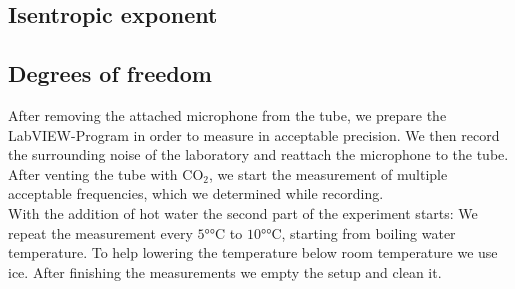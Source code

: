\documentclass[../main.tex]{subfiles}
\begin{document}
\subsection{Isentropic exponent}

\subsection{Degrees of freedom}
    After removing the attached microphone from the tube, we prepare the LabVIEW-Program in order to measure in acceptable precision. We then record the surrounding noise of the laboratory and reattach the microphone to the tube. After venting the tube with $\text{CO}_2$, we start the measurement of multiple acceptable frequencies, which we determined while recording. \\

    With the addition of hot water the second part of the experiment starts: We repeat the measurement every $5\si{\degree\celsius}$ to $10\si{\degree\celsius}$, starting from boiling water temperature. To help lowering the temperature below room temperature we use ice. After finishing the measurements we empty the setup and clean it.
   
\end{document}
